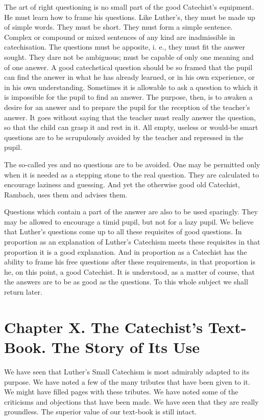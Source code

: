  The art of right questioning is no small part of the good Catechist’s equipment. He must learn how to frame his questions. Like Luther’s, they must be made up of simple words. They must be short. They must form a simple sentence. Complex or compound or mixed sentences of any kind are inadmissible in catechisation. The questions must be apposite, i. e., they must fit the answer sought. They dare not be ambiguous; must be capable of only one meaning and of one answer. A good catechetical question should be so framed that the pupil can find the answer in what he has already learned, or in his own experience, or in his own understanding. Sometimes it is allowable to ask a question to which it is impossible for the pupil to find an answer. The purpose, then, is to awaken a desire for an answer and to prepare the pupil for the reception of the teacher’s answer. It goes without saying that the teacher must really answer the question, so that the child can grasp it and rest in it.
All empty, useless or would-be smart questions are to be scrupulously avoided by the teacher and repressed in the pupil.

The so-called yes and no questions are to be avoided. One may be permitted only when it is needed as a stepping stone to the real question. They are calculated to encourage laziness and guessing. And yet the otherwise good old Catechist, Rambach, uses them and advises them.

 Questions which contain a part of the answer are also to be used sparingly. They may be allowed to encourage a timid pupil, but not for a lazy pupil. We believe that Luther’s questions come up to all these requisites of good questions. In proportion as an explanation of Luther’s Catechism meets these requisites in that proportion it is a good explanation. And in proportion as a Catechist has the ability to frame his free questions after these requirements, in that proportion is he, on this point, a good Catechist. It is understood, as a matter of course, that the answers are to be as good as the questions. To this whole subject we shall return later.

\chapter[Chapter X. The Story of Its Use]{Chapter X. The Catechist’s Text-Book. The Story of Its Use}

We have seen that Luther’s Small Catechism is most admirably adapted to its purpose. We have noted a few of the many tributes that have been given to it. We might have filled pages with these tributes. We have noted some of the criticisms and objections that have been made. We have seen that they are really groundless. The superior value of our text-book is still intact.

